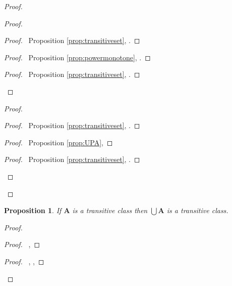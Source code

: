 \documentclass{book}
\let\qed\relax
\newtheorem{prop}[ax]{Proposition}
\theoremstyle{definition}
\begin{document}
\begin{proof}
\pf
{}
\begin{proof}
	\begin{proof}
		\pf\ Proposition \ref{prop:transitiveset}, .
	\end{proof}
	\begin{proof}
		\pf\ Proposition \ref{prop:powermonotone}, .
	\end{proof}
	\begin{proof}
		\pf\ Proposition \ref{prop:transitiveset}, .
	\end{proof}
\end{proof}
\begin{proof}
	\begin{proof}
		\pf\ Proposition \ref{prop:transitiveset}, .
	\end{proof}
	\begin{proof}
		\pf\ Proposition \ref{prop:UPA}, 
	\end{proof}
	\begin{proof}
		\pf\ Proposition \ref{prop:transitiveset}, .
	\end{proof}
\end{proof}
\qed
\end{proof}

\begin{prop}
If $\mathbf{A}$ is a transitive class then $\bigcup \mathbf{A}$ is a transitive class.
\end{prop}

\begin{proof}
\pf
{}
\begin{proof}
	\pf\ , 
\end{proof}
\begin{proof}
	\pf\ , , 
\end{proof}
\qed
\end{proof}
\end{document}
